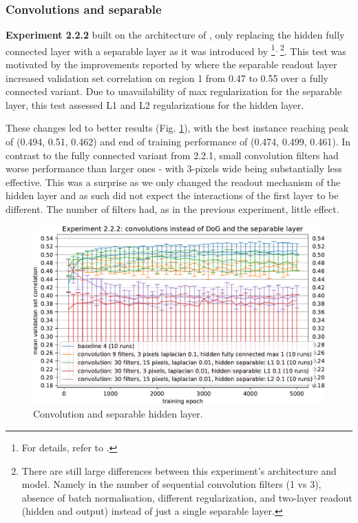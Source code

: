 \subsubsection{Convolutions and separable}\label{ex:2.2.2}

\textbf{Experiment 2.2.2} built on the architecture of , only replacing the hidden fully connected layer with a separable layer as it was introduced by \cite{klindt}\footnote{For details, refer to .}$^{,\thinspace}$\footnote{There are still large differences between this experiment’s architecture and \cite{klindt} model. Namely in the number of sequential convolution filters (1 vs 3), absence of batch normalisation, different regularization, and two-layer readout (hidden and output) instead of just a single separable layer.}. This test was motivated by the improvements reported by \citeauthor{klindt} where the separable readout layer increased validation set correlation on region 1 from 0.47 to 0.55 over a fully connected variant. Due to unavailability of max regularization for the separable layer, this test assessed L1 and L2 regularizations for the hidden layer.

These changes led to better results (Fig. \ref{fig:5.2.2.2}), with the best instance reaching peak of (0.494, 0.51, 0.462) and end of training performance of (0.474, 0.499, 0.461). In contrast to the fully connected variant from 2.2.1, small convolution filters had worse performance than larger ones - with 3-pixels wide being substantially less effective. This was a surprise as we only changed the readout mechanism of the hidden layer and as such did not expect the interactions of the first layer to be different. The number of filters had, as in the previous experiment, little effect.

\begin{figure}[H]
    \centering
    \includegraphics[width=1\textwidth]{../figures/05_2_2_2}
    \caption[Experiment 2.2.2]{Convolution and separable hidden layer.}
    \label{fig:5.2.2.2}
\end{figure}

